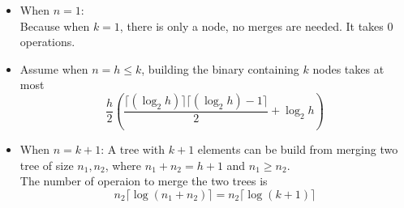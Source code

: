 \documentclass[fleqn,a4paper,12pt]{article}
\begin{document}
\begin{enumerate}
  \begin{itemize}
    \item When $n=1$:\\
      Because when $k=1$, there is only a node, no merges are needed. It takes $0$ operations.

    \item Assume when $n = h \leq k$, building the binary containing $k$ nodes takes at most 
      \[ \frac{h}{2} ( \frac{ \lceil (\log_2 h) \rceil \lceil (\log_2 h) - 1\rceil }{2} + \log_2 h )\]

    \item When $n=k+1$:
      A tree with $k+1$ elements can be build from merging two tree of size $n_1,n_2$, where $n_1+n_2=h+1$ and $n_1 \geq n_2$.\\
      The number of operaion to merge the two trees is 
      \[n_2 \lceil \log (n_1+n_2) \rceil   = n_2 \lceil \log (k+1) \rceil \]


\end{itemize}
\end{enumerate}
\end{document}

